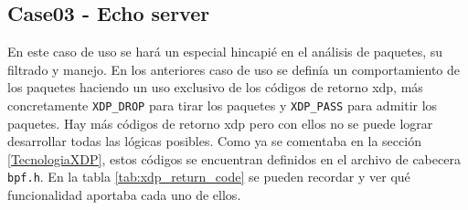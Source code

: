 \vspace{0.3cm}
\subsection{Case03 - Echo server}
\label{xdp_ether_case03}


En este caso de uso se hará un especial hincapié en el análisis de paquetes, su filtrado y manejo. En los anteriores caso de uso se definía un comportamiento de los paquetes haciendo un uso exclusivo de los códigos de retorno \gls{xdp}, más concretamente \texttt{XDP\_DROP} para tirar los paquetes y \texttt{XDP\_PASS} para admitir los paquetes. Hay más códigos de retorno \gls{xdp} pero con ellos no se puede lograr desarrollar todas las lógicas posibles. Como ya se comentaba en la sección \ref{TecnologiaXDP}, estos códigos se encuentran definidos en el archivo de cabecera \texttt{bpf.h}. En la tabla \ref{tab:xdp_return_code} se pueden recordar y ver qué funcionalidad aportaba cada uno de ellos.\\
\par
\vspace{0.3cm}

\begin{table}[ht]
\centering
{}
\caption{Resumen sobre los códigos de retorno XDP}
\label{tab:xdp_return_code}
\end{table}


